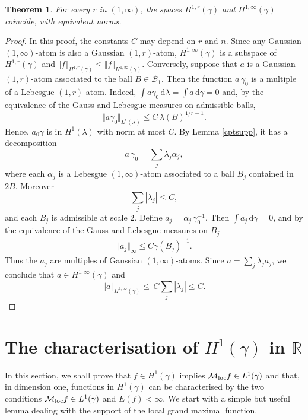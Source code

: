 \documentclass{amsart}                 %
\newtheorem{theorem}{Theorem}[section]
\numberwithin{equation}{section}
\renewcommand\mod[1]{\left\vert{#1}\right\vert}
\newcommand\norm[2]{{\Vert{#1}\Vert_{#2}}}
\newcommand\wrt{\,\mathrm{d}}
\newcommand\1{{\bf 1}}
\newcommand\BR{\mathbb{R}} \newcommand\BRd{\mathbb{R}^d}
\newcommand\cM{\mathcal{M}}  \newcommand\fM{\mathfrak{M}}
\newcommand\mlo {\cM_{\textnormal{loc}}}
\newcommand\huat[1]{H^1(#1)}
\begin{document}
\begin{theorem}\label{1infty}
For every $r$ in $(1,\infty)$, the spaces  $H^{1,r}
(\gamma)$ and $H^{1,\infty}(\gamma)$ coincide, with equivalent norms.
\end{theorem}
\begin{proof}
In this proof, the constants $C$ may depend on $r$ and $n$.
Since any Gaussian $(1,\infty)$-atom  is also a Gaussian $(1,r)$-atom, 
 $H^{1,\infty}(\gamma)$ is a subspace of $H^{1,r}(\gamma)$ and 
$\norm{f}{H^{1,r}(\gamma)}\le\norm{f}{H^{1,\infty}(\gamma)}$.
 Conversely, suppose that $a$ is a Gaussian $(1,r)$-atom 
associated to the  ball $B \in \mathcal{B}_1$. Then the function 
$a\,\gamma_0$ is a multiple of a Lebesgue $(1,r)$-atom. Indeed, 
$\int a\gamma_0\wrt\lambda=\int a\wrt\gamma=0$
and, by the equivalence of the Gauss and Lebesgue measures on 
admissible balls, 
$$
\norm{a\gamma_0}{L^r(\lambda)}\le C\,\lambda(B)^{1/r-1}.
$$
Hence, $a_0\gamma$ is in $H^1(\lambda)$ with norm at most $C$. 
By Lemma \ref{cptsupp}, it has a decomposition
$$
a\,\gamma_0=\sum_j\lambda_j \alpha_j,
$$
where each  $\alpha_j$ is a Lebesgue $(1,\infty)$-atom associated to a 
ball $B_j$ contained in $2B$. Moreover  
$$
\sum_j\mod{\lambda_j}\le C,
$$
and each $B_j$ is admissible at scale $2$.
Define $a_j=\alpha_j\,\gamma_0^{-1}$. Then $\int a_j\wrt\gamma=0$, 
and by the equivalence of the Gauss and Lebesgue measures on 
$B_j$ 
\begin{align*}
\norm{a_j}{\infty}\le C \gamma(B_j)^{-1}.
\end{align*}
Thus the $a_j$ are  multiples of Gaussian $(1,\infty)$-atoms. Since $a=\sum_j\lambda_j a_j$, 
we conclude that $a \in H^{1,\infty}(\gamma)$ and
\begin{equation}\label{nah1}
\norm{a}{H^{1,\infty}(\gamma)}\le\,C \sum_j\mod{\lambda_j}\le C.
\end{equation}
\end{proof}


\section{The  characterisation of $H^1(\gamma)$ in $\BR$}\label
{maxchar1}
In this section, we shall prove that  $f\in \huat
{\gamma}$ implies $\mlo f\in L^1(\gamma)$ and that, in dimension one,  
functions in $H^1(\gamma)$ can be characterised by the two conditions 
$\mlo{f}\in L^1(\gamma)$ and  $E(f)<\infty$. We start with a simple but useful lemma
dealing with the support of the local grand maximal function. 
\par
\end{document}
